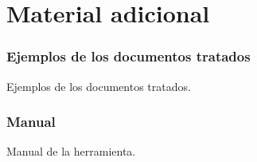 
\chapter{Material adicional}
\label{chap:adicional}


\subsection{Ejemplos de los documentos tratados}

Ejemplos de los documentos tratados.


\subsection{Manual}

Manual de la herramienta.

